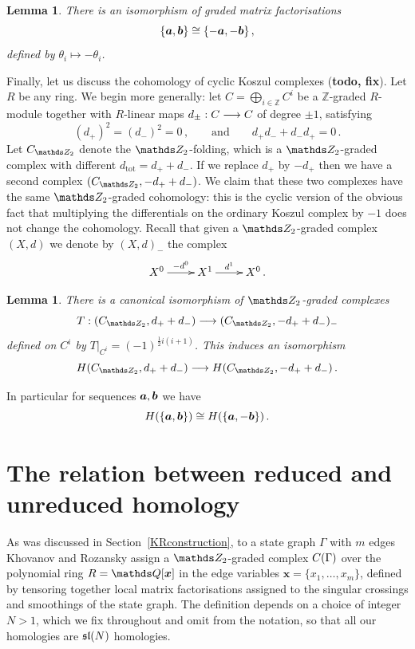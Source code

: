 \documentclass{compositio}
\newtheorem{lemma}[theorem]{Lemma}
\theoremstyle{definition}
\numberwithin{equation}{section}
\begin{document}
\begin{lemma}\label{lemma:cyclickos3} There is an isomorphism of graded matrix factorisations
\[
\{ \boldsymbol{a}, \boldsymbol{b} \} \cong \{ -\boldsymbol{a}, - \boldsymbol{b} \}\,,
\]
defined by $\theta_i \longmapsto - \theta_i$.
\end{lemma}

Finally, let us discuss the cohomology of cyclic Koszul complexes (\textbf{todo, fix}). Let $R$ be any ring. We begin more generally: let $C = \bigoplus_{i \in \mathds{Z}} C^i$ be a $\mathds{Z}$-graded $R$-module together with $R$-linear maps $d_{\pm}: C \longrightarrow C$ of degree $\pm 1$, satisfying
\[
(d_+)^2 = (d_{-})^2 = 0 \, , \qquad \text{and} \qquad d_{+}d_{-} + d_{-}d_{+} = 0 \, .
\]
Let $C_{\Ztwo}$ denote the $\Ztwo$-folding, which is a $\Ztwo$-graded complex with different $d_{\text{tot}} = d_+ + d_{-}$. If we replace $d_{+}$ by $-d_{+}$ then we have a second complex $(C_{\Ztwo}, -d_{+} + d_{-})$. We claim that these two complexes have the same $\Ztwo$-graded cohomology: this is the cyclic version of the obvious fact that multiplying the differentials on the ordinary Koszul complex by $-1$ does not change the cohomology. Recall that given a $\Ztwo$-graded complex $(X,d)$ we denote by $(X,d)_{-}$ the complex
\[
\xymatrix{%
X^0 \ar[r]^-{-d^0} & X^1 \ar[r]^-{d^1} & X^0\,.
}
\]

\begin{lemma}\label{lemma:cyclickoszulsign} There is a canonical isomorphism of $\Ztwo$-graded complexes
\[
T: (C_{\Ztwo}, d_{+} + d_{-}) \lto (C_{\Ztwo}, -d_{+} + d_{-})_{-}
\]
defined on $C^i$ by $T|_{C^i} = (-1)^{\frac{1}{2}i(i+1)}$. This induces an isomorphism
\[
H(C_{\Ztwo}, d_{+} + d_{-}) \lto H(C_{\Ztwo}, -d_{+} + d_{-}) \, .
\]
\end{lemma}

In particular for sequences $\boldsymbol{a}, \boldsymbol{b}$ we have
\begin{equation}
\label{Habba}
H(\{ \boldsymbol{a}, \boldsymbol{b} \}) \cong H(\{\boldsymbol{a}, -\boldsymbol{b}\}) \, .
\end{equation}

\section{The relation between reduced and unreduced homology}

As was discussed in Section~\ref{KRconstruction}, to a state graph $\Gamma$ with $m$ edges Khovanov and Rozansky assign a $\Ztwo$-graded complex $C(\Gamma)$ over the polynomial ring $R = \QQ[\boldsymbol{x}]$ in the edge variables $\boldsymbol{x} = \{x_1,\ldots,x_m\}$, defined by tensoring together local matrix factorisations assigned to the singular crossings and smoothings of the state graph. The definition depends on a choice of integer $N > 1$, which we fix throughout and omit from the notation, so that all our homologies are $\mathfrak{sl}(N)$ homologies.
\end{document}
